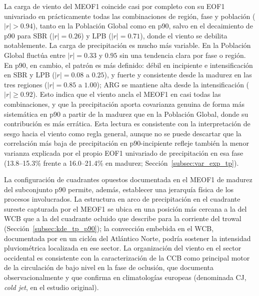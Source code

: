 La carga de viento del MEOF1 coincide casi por completo con su EOF1 univariado en prácticamente todas las combinaciones de región, fase y población ($|r|>0.94$), tanto en la Población Global como en p90, salvo en el decaimiento de p90 para SBR ($|r|=0.26$) y LPB ($|r|=0.71$), donde el viento se debilita notablemente. La carga de precipitación es mucho más variable. En la Población Global fluctúa entre $|r|=0.33$ y $0.95$ sin una tendencia clara por fase o región. En p90, en cambio, el patrón es más definido: débil en incipiente e intensificación en SBR y LPB ($|r|=0.08$ a $0.25$), y fuerte y consistente desde la madurez en las tres regiones ($|r|=0.85$ a $1.00$); ARG se mantiene alta desde la intensificación ($|r|\geq0.92$). Esto indica que el viento ancla el MEOF1 en casi todas las combinaciones, y que la precipitación aporta covarianza genuina de forma más sistemática en p90 a partir de la madurez que en la Población Global, donde su contribución es más errática. Esta lectura es consistente con la interpretación de sesgo hacia el viento como regla general, aunque no se puede descartar que la correlación más baja de precipitación en p90-incipiente refleje también la menor varianza explicada por el propio EOF1 univariado de precipitación en esa fase (13.8--15.3\% frente a 16.0--21.4\% en madurez; Sección~\ref{subsec:var_exp_tp}).

La configuración de cuadrantes opuestos documentada en el MEOF1 de madurez del subconjunto p90 permite, además, establecer una jerarquía física de los procesos involucrados.
La estructura en arco de precipitación en el cuadrante sureste capturada por el MEOF1 se ubica en una posición más cercana a la del WCB que a la del cuadrante ocluido que \citet{martin1999forcing} describe para la corriente del trowal (Sección~\ref{subsec:kde_tp_p90}); la convección embebida en el WCB, documentada por \citet{oertel2021warm} en un ciclón del Atlántico Norte, podría sostener la intensidad pluviométrica localizada en ese sector.
La organización del viento en el sector occidental es consistente con la caracterización de la CCB como principal motor de la circulación de bajo nivel en la fase de oclusión, que \citet{martinez2014cold} documenta observacionalmente y que \citet{eisenstein2023identification} confirma en climatologías europeas (denominada CJ, \textit{cold jet}, en el estudio original).

